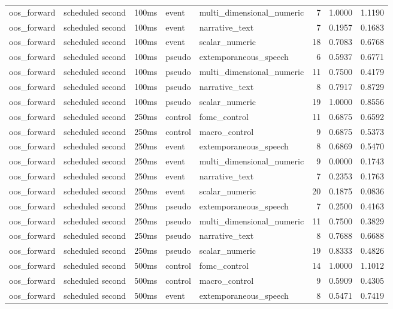 \begin{tabular}{lllllrrr}
oos_forward & scheduled second & 100ms & event & multi_dimensional_numeric & 7 & 1.0000 & 1.1190 \\
oos_forward & scheduled second & 100ms & event & narrative_text & 7 & 0.1957 & 0.1683 \\
oos_forward & scheduled second & 100ms & event & scalar_numeric & 18 & 0.7083 & 0.6768 \\
oos_forward & scheduled second & 100ms & pseudo & extemporaneous_speech & 6 & 0.5937 & 0.6771 \\
oos_forward & scheduled second & 100ms & pseudo & multi_dimensional_numeric & 11 & 0.7500 & 0.4179 \\
oos_forward & scheduled second & 100ms & pseudo & narrative_text & 8 & 0.7917 & 0.8729 \\
oos_forward & scheduled second & 100ms & pseudo & scalar_numeric & 19 & 1.0000 & 0.8556 \\
oos_forward & scheduled second & 250ms & control & fomc_control & 11 & 0.6875 & 0.6592 \\
oos_forward & scheduled second & 250ms & control & macro_control & 9 & 0.6875 & 0.5373 \\
oos_forward & scheduled second & 250ms & event & extemporaneous_speech & 8 & 0.6869 & 0.5470 \\
oos_forward & scheduled second & 250ms & event & multi_dimensional_numeric & 9 & 0.0000 & 0.1743 \\
oos_forward & scheduled second & 250ms & event & narrative_text & 7 & 0.2353 & 0.1763 \\
oos_forward & scheduled second & 250ms & event & scalar_numeric & 20 & 0.1875 & 0.0836 \\
oos_forward & scheduled second & 250ms & pseudo & extemporaneous_speech & 7 & 0.2500 & 0.4163 \\
oos_forward & scheduled second & 250ms & pseudo & multi_dimensional_numeric & 11 & 0.7500 & 0.3829 \\
oos_forward & scheduled second & 250ms & pseudo & narrative_text & 8 & 0.7688 & 0.6688 \\
oos_forward & scheduled second & 250ms & pseudo & scalar_numeric & 19 & 0.8333 & 0.4826 \\
oos_forward & scheduled second & 500ms & control & fomc_control & 14 & 1.0000 & 1.1012 \\
oos_forward & scheduled second & 500ms & control & macro_control & 9 & 0.5909 & 0.4305 \\
oos_forward & scheduled second & 500ms & event & extemporaneous_speech & 8 & 0.5471 & 0.7419 \\

\end{tabular}
